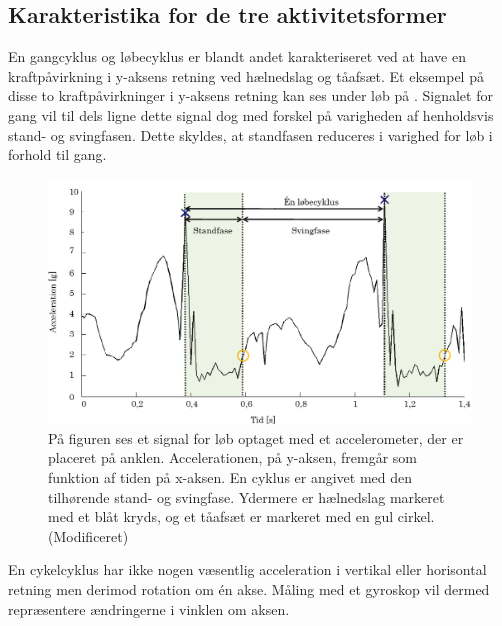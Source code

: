 \subsection{Karakteristika for de tre aktivitetsformer}
En gangcyklus og løbecyklus er blandt andet karakteriseret ved at have en kraftpåvirkning i y-aksens retning ved hælnedslag og tåafsæt. Et eksempel på disse to kraftpåvirkninger i y-aksens retning kan ses under løb på . Signalet for gang vil til dels ligne dette signal dog med forskel på varigheden af henholdsvis stand- og svingfasen. Dette skyldes, at standfasen reduceres i varighed for løb i forhold til gang. %
\begin{figure}[H]
	\centering
	\includegraphics[scale=0.3]{figures/bProblemloesning/loeb_skolebog.png}
	\caption{På figuren ses et signal for løb optaget med et accelerometer, der er placeret på anklen. Accelerationen, på y-aksen, fremgår som funktion af tiden på x-aksen. En cyklus er angivet med den tilhørende stand- og svingfase. Ydermere er hælnedslag markeret med et blåt kryds, og et tåafsæt er markeret med en gul cirkel. \citep{WeyandKelly2001} (Modificeret)}
	\label{fig:loeb_skolebog}
\end{figure}
En cykelcyklus har ikke nogen væsentlig acceleration i vertikal eller horisontal retning men derimod rotation om én akse. Måling med et gyroskop vil dermed repræsentere ændringerne i vinklen om aksen. \citep{Cockcroft2011,Marin-PerianuMarin-Perianu2013}


